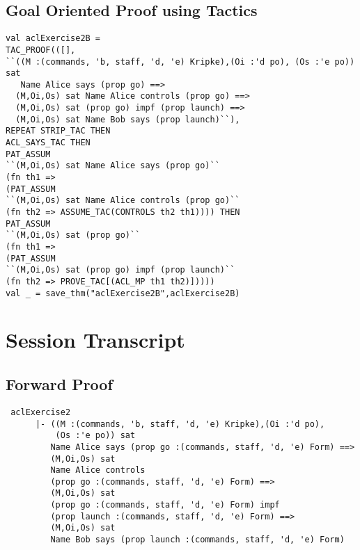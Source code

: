 \documentclass{report}
\begin{document}
\subsection{Goal Oriented Proof using Tactics}
\label{goal-oriented-proof-tacs-13-2}
\begin{lstlisting}[frame=TBlr]
val aclExercise2B =
TAC_PROOF(([],
``((M :(commands, 'b, staff, 'd, 'e) Kripke),(Oi :'d po), (Os :'e po)) sat
   Name Alice says (prop go) ==>
  (M,Oi,Os) sat Name Alice controls (prop go) ==>
  (M,Oi,Os) sat (prop go) impf (prop launch) ==>
  (M,Oi,Os) sat Name Bob says (prop launch)``),
REPEAT STRIP_TAC THEN
ACL_SAYS_TAC THEN
PAT_ASSUM
``(M,Oi,Os) sat Name Alice says (prop go)``
(fn th1 =>
(PAT_ASSUM
``(M,Oi,Os) sat Name Alice controls (prop go)``
(fn th2 => ASSUME_TAC(CONTROLS th2 th1)))) THEN
PAT_ASSUM
``(M,Oi,Os) sat (prop go)``
(fn th1 =>
(PAT_ASSUM
``(M,Oi,Os) sat (prop go) impf (prop launch)``
(fn th2 => PROVE_TAC[(ACL_MP th1 th2)]))))
val _ = save_thm("aclExercise2B",aclExercise2B)
\end{lstlisting}


\section{Session Transcript}
\label{13-2-trans}

\subsection{Forward Proof}
\label{op-forward-proof-13-2}
\begin{session}
  \begin{scriptsize}
\begin{verbatim}
 aclExercise2
      |- ((M :(commands, 'b, staff, 'd, 'e) Kripke),(Oi :'d po),
          (Os :'e po)) sat
         Name Alice says (prop go :(commands, staff, 'd, 'e) Form) ==>
         (M,Oi,Os) sat
         Name Alice controls
         (prop go :(commands, staff, 'd, 'e) Form) ==>
         (M,Oi,Os) sat
         (prop go :(commands, staff, 'd, 'e) Form) impf
         (prop launch :(commands, staff, 'd, 'e) Form) ==>
         (M,Oi,Os) sat
         Name Bob says (prop launch :(commands, staff, 'd, 'e) Form)
\end{verbatim}
  \end{scriptsize}
\end{session}
\end{document}
